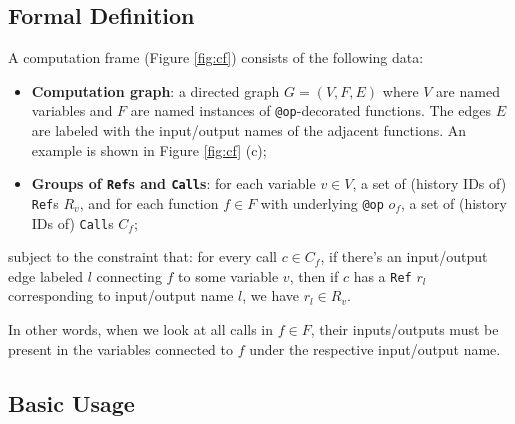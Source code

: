 \subsection{Formal Definition}
\label{subsection:cf-definition}


A computation frame (Figure \ref{fig:cf}) consists of the following data:
\begin{itemize}
\item \textbf{Computation graph}: a directed graph $G=(V,F,E)$ where $V$ are
named variables and $F$ are named instances of \texttt{@op}-decorated functions.
The edges $E$ are labeled with the input/output names of the adjacent functions.
An example is shown in Figure \ref{fig:cf} (c);
\item \textbf{Groups of \texttt{Ref}s and \texttt{Call}s}: for each variable
$v\in V$, a set of (history IDs of) \texttt{Ref}s $R_v$, and for each function
$f\in F$ with underlying \texttt{@op} $o_f$, a set of (history IDs of) \texttt{Call}s $C_f$;
\end{itemize}
subject to the constraint that: for every call $c\in C_f$, if there's an
input/output edge labeled $l$ connecting $f$ to some variable $v$, then if $c$
has a \texttt{Ref} $r_l$ corresponding to input/output name $l$, we have $r_l\in
R_v$.

In other words, when we look at all calls in $f\in F$, their inputs/outputs must
be present in the variables connected to $f$ under the respective input/output
name.

\subsection{Basic Usage}
\label{subsection:cf-basic-usage}

